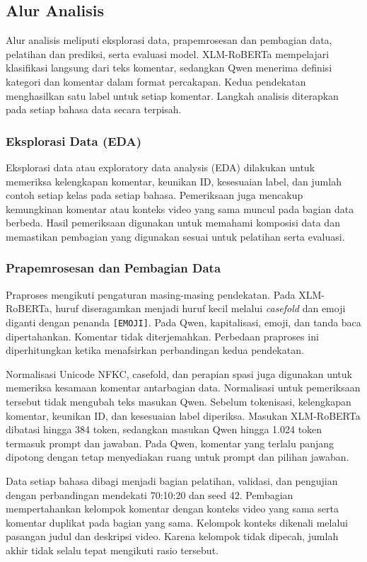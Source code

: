 \documentclass[11pt]{article}
\begin{document}
\subsection{Alur Analisis}
Alur analisis meliputi eksplorasi data, prapemrosesan dan pembagian data, pelatihan dan prediksi, serta evaluasi model. XLM-RoBERTa mempelajari klasifikasi langsung dari teks komentar, sedangkan Qwen menerima definisi kategori dan komentar dalam format percakapan. Kedua pendekatan menghasilkan satu label untuk setiap komentar. Langkah analisis diterapkan pada setiap bahasa data secara terpisah.

\subsubsection{Eksplorasi Data (EDA)}
Eksplorasi data atau exploratory data analysis (EDA) dilakukan untuk memeriksa kelengkapan komentar, keunikan ID, kesesuaian label, dan jumlah contoh setiap kelas pada setiap bahasa. Pemeriksaan juga mencakup kemungkinan komentar atau konteks video yang sama muncul pada bagian data berbeda. Hasil pemeriksaan digunakan untuk memahami komposisi data dan memastikan pembagian yang digunakan sesuai untuk pelatihan serta evaluasi.

\subsubsection{Prapemrosesan dan Pembagian Data}
Praproses mengikuti pengaturan masing-masing pendekatan. Pada XLM-RoBERTa, huruf diseragamkan menjadi huruf kecil melalui \textit{casefold} dan emoji diganti dengan penanda \texttt{[EMOJI]}. Pada Qwen, kapitalisasi, emoji, dan tanda baca dipertahankan. Komentar tidak diterjemahkan. Perbedaan praproses ini diperhitungkan ketika menafsirkan perbandingan kedua pendekatan.

Normalisasi Unicode NFKC, casefold, dan perapian spasi juga digunakan untuk memeriksa kesamaan komentar antarbagian data. Normalisasi untuk pemeriksaan tersebut tidak mengubah teks masukan Qwen. Sebelum tokenisasi, kelengkapan komentar, keunikan ID, dan kesesuaian label diperiksa. Masukan XLM-RoBERTa dibatasi hingga 384 token, sedangkan masukan Qwen hingga 1.024 token termasuk prompt dan jawaban. Pada Qwen, komentar yang terlalu panjang dipotong dengan tetap menyediakan ruang untuk prompt dan pilihan jawaban.

Data setiap bahasa dibagi menjadi bagian pelatihan, validasi, dan pengujian dengan perbandingan mendekati 70:10:20 dan seed 42. Pembagian mempertahankan kelompok komentar dengan konteks video yang sama serta komentar duplikat pada bagian yang sama. Kelompok konteks dikenali melalui pasangan judul dan deskripsi video. Karena kelompok tidak dipecah, jumlah akhir tidak selalu tepat mengikuti rasio tersebut.
\end{document}
